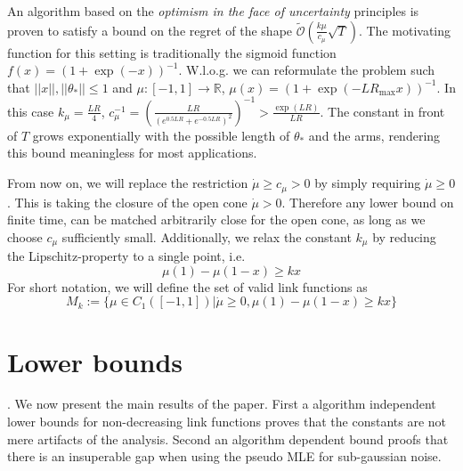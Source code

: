 \documentclass[twoside]{article} \usepackage{aistats2017}
\begin{document}
An algorithm based on the \textit{optimism in the face of uncertainty} principles is proven to satisfy a bound on the regret of the shape $\tilde{\mathcal{O}}(\frac{k\mu}{c_\mu}\sqrt{T})$. 
The motivating function for this setting is traditionally the sigmoid function $f(x) = (1+\exp(-x))^{-1}$.
W.l.o.g. we can reformulate the problem such that $||x||,||\theta_*||\leq 1$ and $\mu:[-1,1]\rightarrow\mathbb{R}$,
$\mu(x) = (1+\exp(-LR_{\max}x))^{-1}$.
In this case $k_\mu = \frac{LR}{4}$, $c_\mu^{-1} = \left(\frac{LR}{(e^{0.5LR}+e^{-0.5LR})^2}\right)^{-1} > \frac{\exp(LR)}{LR}$. The constant in front of $T$ grows exponentially with the possible length of $\theta_*$ and the arms, rendering this bound meaningless for most applications.

From now on, we will replace the restriction $\dot{\mu}\geq c_\mu >0$ by simply requiring $\dot{\mu}\geq0$. This is taking the closure of the open cone $\dot{\mu}>0$. Therefore any lower bound on finite time, can be matched arbitrarily close for the open cone, as long as we choose $c_\mu$ sufficiently small.
Additionally, we relax the constant $k_\mu$ by reducing the Lipschitz-property to a single point, i.e.
$$\mu(1)-\mu(1-x)\geq kx$$
For short notation, we will define the set of valid link functions as
$$M_k := \{\mu \in C_1([-1,1]) | \dot{\mu}\geq 0, \mu(1)-\mu(1-x)\geq kx\}$$

\section{Lower bounds}\label{lowerBounds}
.
We now present the main results of the paper. 
First a algorithm independent lower bounds for non-decreasing link functions proves that the constants are not mere artifacts of the analysis. 
Second an algorithm dependent bound proofs that there is an insuperable gap when using the pseudo MLE for sub-gaussian noise.
\end{document}
